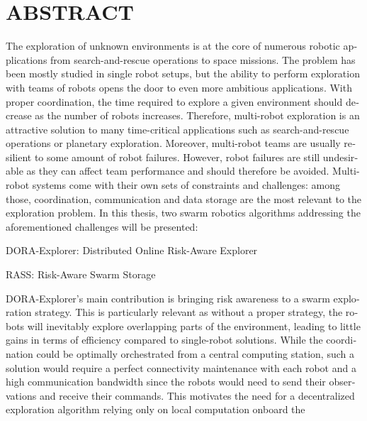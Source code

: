 %

\chapter*{ABSTRACT}\thispagestyle{headings}

\begin{otherlanguage}{english}
The exploration of unknown environments is at the core of numerous
robotic applications from search-and-rescue operations to space
missions. The problem has been mostly 
studied in single robot setups, but the ability to perform exploration 
with teams of robots opens the door to even more ambitious
applications. With proper coordination, the time required to
explore a given environment should decrease as the number of robots increases. Therefore, multi-robot
exploration is an attractive solution to many time-critical
applications such as search-and-rescue operations or planetary
exploration. Moreover, multi-robot teams are usually resilient to some
amount of robot
failures. However,
robot failures are still undesirable as they can affect team
performance and should therefore be avoided. Multi-robot systems come with their own sets of constraints and
challenges: among those, coordination, communication and data storage are the most
relevant to the exploration problem. In this thesis, two swarm robotics algorithms addressing the aforementioned challenges will be presented:
\begin{compactitem}
    \item DORA-Explorer: Distributed Online Risk-Aware Explorer
    \item RASS: Risk-Aware Swarm Storage
\end{compactitem}
DORA-Explorer's main contribution is bringing risk awareness to a swarm exploration strategy. This is particularly relevant as without a proper strategy, the robots
will inevitably explore overlapping parts of the environment, leading
to little gains in terms of efficiency compared to single-robot
solutions. While the coordination could be optimally orchestrated from
a central computing station, such a solution would require a perfect
connectivity maintenance with each robot and a high communication
bandwidth since the robots would need to send their observations and
receive their commands. This motivates the need for a decentralized
exploration algorithm relying only on local computation onboard the

\end{otherlanguage}
